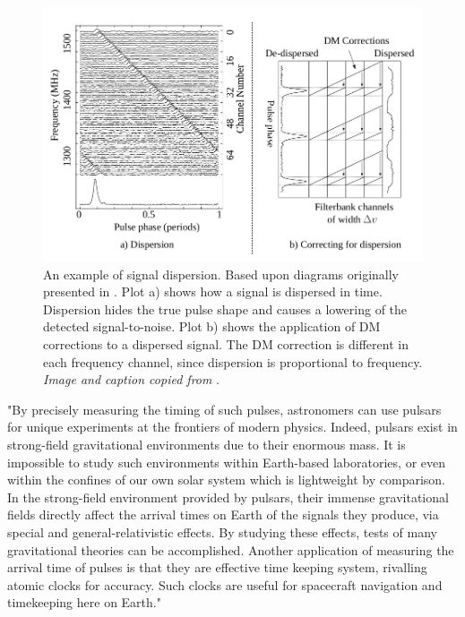 \begin{figure}[!h]
\centering
\includegraphics[scale=0.3]{figures/fig-4}
\caption[Signal Dispersion]{An example of signal dispersion. Based upon diagrams originally presented in \citep{lorimer}. Plot a) shows how a signal is dispersed in time. Dispersion hides the true pulse shape and causes a lowering of the detected signal-to-noise. Plot b) shows the application of DM corrections to a dispersed signal. The DM correction is different in each frequency channel, since dispersion is proportional to frequency. \textit{Image and caption copied from} \citep{lyon}.}	
\label{fig:fig-4}
\end{figure}

"By precisely measuring the timing of such pulses, astronomers can use pulsars for unique experiments at the frontiers of modern physics. Indeed, pulsars exist in strong-field gravitational environments due to their enormous mass. It is impossible to study such environments within Earth-based laboratories, or even within the confines of our own solar system which is lightweight by comparison. In the strong-field environment provided by pulsars, their immense gravitational fields directly affect the arrival times on Earth of the signals they produce, via special and general-relativistic effects. By studying these effects, tests of many gravitational theories can be accomplished.  Another application of measuring the arrival time of pulses is that they are effective time keeping system, rivalling atomic clocks for accuracy. Such clocks are useful for spacecraft navigation and timekeeping here on Earth."